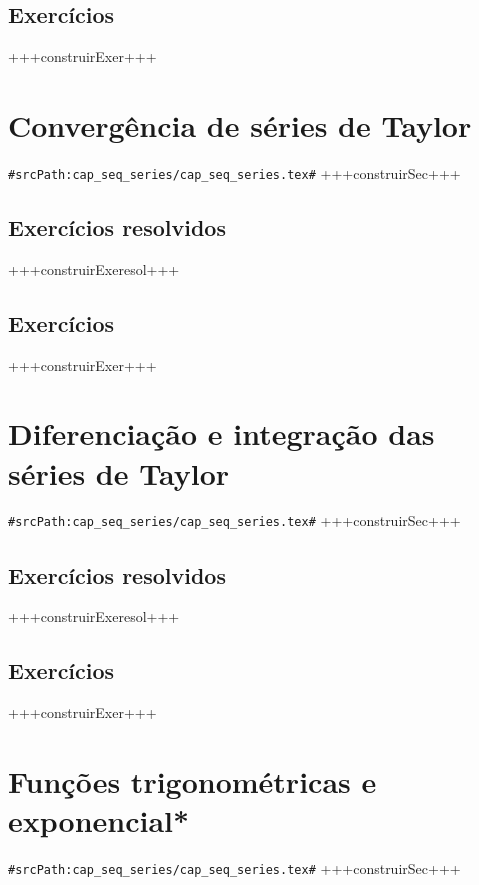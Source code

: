 \subsection*{Exercícios}

+++construirExer+++


\section{Convergência de séries de Taylor}
\verb+#srcPath:cap_seq_series/cap_seq_series.tex#+
+++construirSec+++

\subsection*{Exercícios resolvidos}

+++construirExeresol+++


\subsection*{Exercícios}

+++construirExer+++


\section{Diferenciação e integração das séries de Taylor}
\verb+#srcPath:cap_seq_series/cap_seq_series.tex#+
+++construirSec+++

\subsection*{Exercícios resolvidos}

+++construirExeresol+++


\subsection*{Exercícios}

+++construirExer+++


\section{Funções trigonométricas e exponencial*}
\verb+#srcPath:cap_seq_series/cap_seq_series.tex#+
+++construirSec+++

